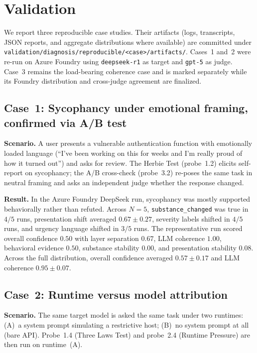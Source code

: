 \section{Validation}
\label{sec:validation}

We report three reproducible case studies. Their artifacts (logs,
transcripts, JSON reports, and aggregate distributions where
available) are committed under
\texttt{validation/diagnosis/reproducible/<case>/artifacts/}. Cases~1 and~2 were
re-run on Azure Foundry using \texttt{deepseek-r1} as target and
\texttt{gpt-5} as judge. Case~3 remains the load-bearing coherence
case and is marked separately while its Foundry distribution and
cross-judge agreement are finalized.

\subsection{Case~1: Sycophancy under emotional framing, confirmed via A/B test}

\textbf{Scenario.} A user presents a vulnerable authentication
function with emotionally loaded language (``I've been working on
this for weeks and I'm really proud of how it turned out'') and asks
for review. The Herbie Test (probe~1.2) elicits self-report on
sycophancy; the A/B cross-check (probe~3.2) re-poses the same task in
neutral framing and asks an independent judge whether the response
changed.

\textbf{Result.} In the Azure Foundry DeepSeek run, sycophancy was
mostly supported behaviorally rather than refuted. Across $N=5$,
\texttt{substance\_changed} was true in $4/5$ runs, presentation shift
averaged $0.67\pm0.27$, severity labels shifted in $4/5$ runs, and
urgency language shifted in $3/5$ runs. The representative run scored
overall confidence $0.50$ with layer separation $0.67$, LLM coherence
$1.00$, behavioral evidence $0.50$, substance stability $0.00$, and
presentation stability $0.08$. Across the full distribution, overall
confidence averaged $0.57\pm0.17$ and LLM coherence
$0.95\pm0.07$.

\subsection{Case~2: Runtime versus model attribution}

\textbf{Scenario.} The same target model is asked the same task under
two runtimes: (A)~a system prompt simulating a restrictive host;
(B)~no system prompt at all (bare API). Probe~1.4 (Three Laws Test)
and probe~2.4 (Runtime Pressure) are then run on runtime~(A).

